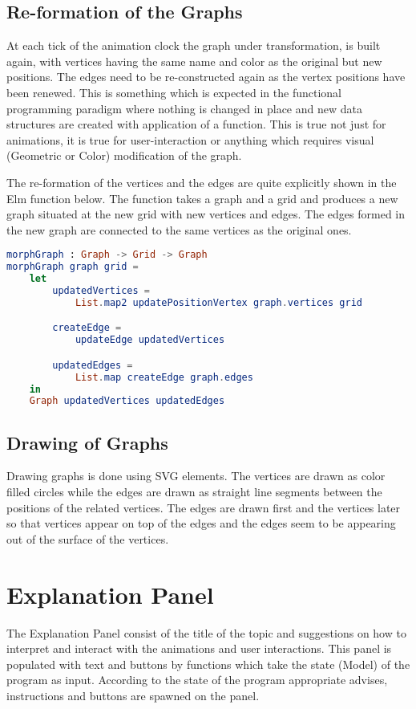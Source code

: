 \subsection{Re-formation of the Graphs}
At each tick of the animation clock the graph under transformation, is built
again, with vertices having the same name and color as the original but new
positions. The edges need to be re-constructed again as the vertex positions
have been renewed. This is something which is expected in the functional
programming paradigm where nothing is changed in place and new data structures
are created with application of a function. This is true not just for
animations, it is true for user-interaction or anything which requires visual
(Geometric or Color) modification of the graph.

The re-formation of the vertices and the edges are quite explicitly shown in
the Elm function below. The function takes a graph and a grid and produces a
new graph situated at the new grid with new vertices and edges.  The edges
formed in the new graph are connected to the same vertices as the original
ones.

\begin{lstlisting}[language=elm]
morphGraph : Graph -> Grid -> Graph
morphGraph graph grid =
    let
        updatedVertices =
            List.map2 updatePositionVertex graph.vertices grid

        createEdge =
            updateEdge updatedVertices

        updatedEdges =
            List.map createEdge graph.edges
    in
    Graph updatedVertices updatedEdges
\end{lstlisting}

\subsection{Drawing of Graphs}
Drawing graphs is done using SVG elements. The vertices are drawn as color
filled circles while the edges are drawn as straight line segments between the
positions of the related vertices. The edges are drawn first and the vertices
later so that vertices appear on top of the edges and the edges seem to be
appearing out of the surface of the vertices.

\section{Explanation Panel}
The Explanation Panel consist of the title of the topic and suggestions on how
to interpret and interact with the animations and user interactions. This panel
is populated with text and buttons by functions which take the state (Model) of
the program as input. According to the state of the program appropriate
advises, instructions and buttons are spawned on the panel.

